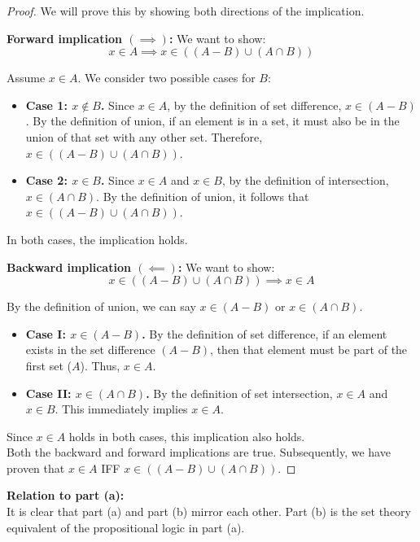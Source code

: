 \documentclass{article}
\begin{document}
\begin{proof}
We will prove this by showing both directions of the implication.

\textbf{Forward implication $(\implies)$:} We want to show: 
$$x \in A \implies x \in ((A - B) \cup (A \cap B))$$

Assume $x \in A$. We consider two possible cases for $B$:
\begin{itemize}
    \item \textbf{Case 1: $x \notin B$.} Since $x \in A$, by the definition of set difference, $x \in (A - B)$. By the definition of union, if an element is in a set, it must also be in the union of that set with any other set. Therefore, $x \in ((A - B) \cup (A \cap B))$.
    \item \textbf{Case 2: $x \in B$.} Since $x \in A$ and $x \in B$, by the definition of intersection, $x \in (A \cap B)$. By the definition of union, it follows that $x \in ((A - B) \cup (A \cap B))$.
\end{itemize}

In both cases, the implication holds.



\noindent\textbf{Backward implication $(\impliedby)$:} We want to show: 
$$x \in ((A - B) \cup (A \cap B)) \implies x \in A$$

By the definition of union, we can say $x \in (A - B)$ or $x \in (A \cap B)$.

\begin{itemize}
    \item \textbf{Case I: $x \in (A - B)$.} By the definition of set difference, if an element exists in the set difference $(A - B)$, then that element must be part of the first set ($A$). Thus, $x \in A$.
    \item \textbf{Case II: $x \in (A \cap B)$.} By the definition of set intersection, $x \in A$ and $x \in B$. This immediately implies $x \in A$.
\end{itemize}

Since $x \in A$ holds in both cases, this implication also holds.
\\
Both the backward and forward implications are true. Subsequently, we have proven that $x \in A$ IFF $x \in ((A - B) \cup (A \cap B))$.
\end{proof}

\textbf{Relation to part (a):}
~\\
It is clear that part (a) and part (b) mirror each other. Part (b) is the set theory equivalent of the propositional logic in part (a).
\end{document}
